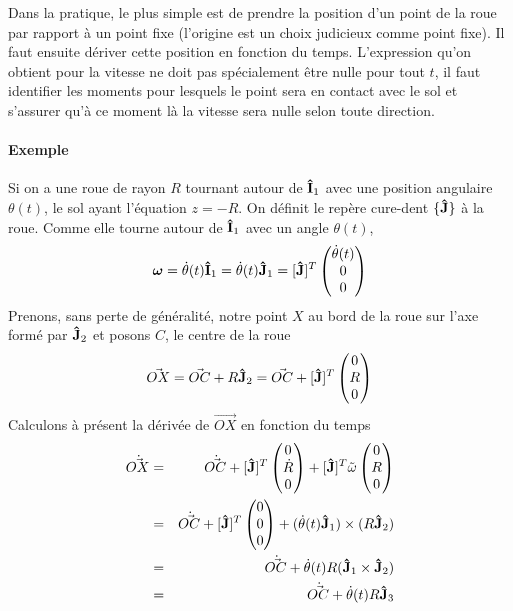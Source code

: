 \documentclass[11pt,a4paper]{article}
\newcommand\ui{{\bf\hat{I}}} %
\newcommand\uj{{\bf\hat{J}}} %
\newcommand\omegaf{{\bm \omega}}
\newcommand\omegat{\tilde{\omega}}
\newcommand\dvec[1]{\dot{\vec{ #1}}}
\begin{document}
Dans la pratique, le plus simple est de prendre la position d'un point de la roue par rapport à un point fixe (l'origine est un choix judicieux comme point fixe).
Il faut ensuite dériver cette position en fonction du temps.
L'expression qu'on obtient pour la vitesse ne doit pas spécialement être nulle pour tout $t$, il faut identifier les moments pour lesquels le point sera en contact avec le sol et s'assurer qu'à ce moment là la vitesse sera nulle selon toute direction.

\paragraph{Exemple}
Si on a une roue de rayon $R$ tournant autour de $\ui_1$ avec une position angulaire $\theta(t)$, le sol ayant l'équation $z = -R$.
On définit le repère cure-dent $\{\uj\}$ à la roue.
Comme elle tourne autour de $\ui_1$ avec un angle $\theta(t)$,
\[ \omegaf = \dot{\theta}(t) \ui_1 = \dot{\theta}(t) \uj_1 = [\uj]^T \begin{pmatrix}\dot{\theta}(t)\\0\\0\end{pmatrix} \]
Prenons, sans perte de généralité, notre point $X$ au bord de la roue sur l'axe formé par $\uj_2$ et posons $C$, le centre de la roue
\[ \vec{OX} = \vec{OC} + R \uj_2 = \vec{OC} + [\uj]^T \begin{pmatrix}0\\R\\0\end{pmatrix} \]
Calculons à présent la dérivée de $\vec{OX}$ en fonction du temps
\begin{eqnarray*}
	\dvec{OX} &=& \dvec{OC} + [\uj]^T \begin{pmatrix}0\\\dot{R}\\0\end{pmatrix} + [\uj]^T \omegat \begin{pmatrix}0\\R\\0\end{pmatrix}\\
	&=& \dvec{OC} + [\uj]^T \begin{pmatrix}0\\0\\0\end{pmatrix} + (\dot{\theta}(t) \uj_1) \times (R \uj_2)\\
	&=& \dvec{OC} + \dot{\theta}(t) R (\uj_1 \times \uj_2)\\
	&=& \dvec{OC} + \dot{\theta}(t) R \uj_3\\
\end{eqnarray*}
\end{document}
